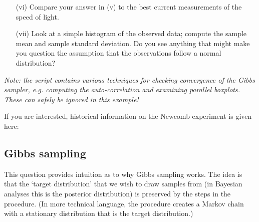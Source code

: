 \documentclass{article}
\newcommand{\1}{\mathbf{1}}
\begin{document}
\begin{enumerate}
\begin{enumerate}
    \item[(vi)] Compare your answer in (v) to the best current measurements of the speed of light. 
    
    \item[(vii)] Look at a simple histogram of the observed data; compute the sample mean and sample standard deviation. Do you see anything that might make you question the assumption that the observations follow a normal distribution?
\end{enumerate}

{\it\scriptsize Note: the script contains various techniques for checking convergence of the Gibbs sampler, e.g. computing the auto-correlation and examining parallel boxplots. These can safely be ignored in this example!}
\end{enumerate}

{\small If you are interested, historical information on the Newcomb experiment is given here:

\par
}

\eject

\subsection*{Gibbs sampling}

This question provides intuition as to why Gibbs sampling works. The idea is that the `target distribution' that we wish to draw samples from 
(in Bayesian analyses this is the posterior distribution) is preserved by the steps in the procedure. (In more technical language, the procedure creates a Markov chain with a stationary distribution that is the target distribution.)
\end{document}
